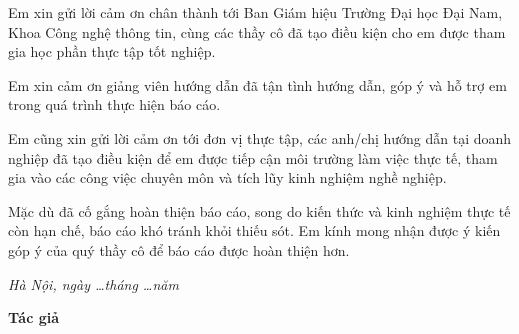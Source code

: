 
Em xin gửi lời cảm ơn chân thành tới Ban Giám hiệu Trường Đại học Đại Nam, Khoa Công nghệ thông tin, cùng các thầy cô đã tạo điều kiện cho em được tham gia học phần thực tập tốt nghiệp.

Em xin cảm ơn giảng viên hướng dẫn \GiangVienHD{} đã tận tình hướng dẫn, góp ý và hỗ trợ em trong quá trình thực hiện báo cáo.

Em cũng xin gửi lời cảm ơn tới đơn vị thực tập, các anh/chị hướng dẫn tại doanh nghiệp đã tạo điều kiện để em được tiếp cận môi trường làm việc thực tế, tham gia vào các công việc chuyên môn và tích lũy kinh nghiệm nghề nghiệp.

Mặc dù đã cố gắng hoàn thiện báo cáo, song do kiến thức và kinh nghiệm thực tế còn hạn chế, báo cáo khó tránh khỏi thiếu sót. Em kính mong nhận được ý kiến góp ý của quý thầy cô để báo cáo được hoàn thiện hơn.

\vspace{1cm}

\begin{flushright}
\begin{minipage}{8cm}
\centering
\textit{Hà Nội, ngày \ldots tháng \ldots năm \Nam}

\vspace{0.5cm}

\textbf{Tác giả}

\vspace{2cm}

\end{minipage}
\end{flushright}
